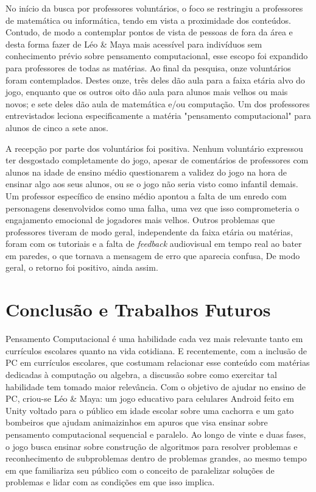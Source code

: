 \documentclass[conference]{IEEEtran}
\begin{document}
No início da busca por professores voluntários, o foco se restringiu a professores de matemática ou informática, tendo em vista a proximidade dos conteúdos. Contudo, de modo a contemplar pontos de vista de pessoas de fora da área e desta forma fazer de Léo \& Maya mais acessível para indivíduos sem conhecimento prévio sobre pensamento computacional, esse escopo foi expandido para professores de todas as matérias. Ao final da pesquisa, onze voluntários foram contemplados. Destes onze, três deles dão aula para a faixa etária alvo do jogo, enquanto que os outros oito dão aula para alunos mais velhos ou mais novos; e sete deles dão aula de matemática e/ou computação. Um dos professores entrevistados leciona especificamente a matéria "pensamento computacional" para alunos de cinco a sete anos.

A recepção por parte dos voluntários foi positiva. Nenhum voluntário expressou ter desgostado completamente do jogo, apesar de comentários de professores com alunos na idade de ensino médio questionarem a validez do jogo na hora de ensinar algo aos seus alunos, ou se o jogo não seria visto como infantil demais. Um professor específico de ensino médio apontou a falta de um enredo com personagens desenvolvidos como uma falha, uma vez que isso comprometeria o engajamento emocional de jogadores mais velhos. Outros problemas que professores tiveram de modo geral, independente da faixa etária ou matérias, foram com os tutoriais e a falta de \textit{feedback} audiovisual em tempo real ao bater em paredes, o que tornava a mensagem de erro que aparecia confusa, De modo geral, o retorno foi positivo, ainda assim.

\section{Conclusão e Trabalhos Futuros}

Pensamento Computacional é uma habilidade cada vez mais relevante tanto em currículos escolares quanto na vida cotidiana. E recentemente, com a inclusão de PC em currículos escolares, que costumam relacionar esse conteúdo com matérias dedicadas à computação ou algebra, a discussão sobre como exercitar tal habilidade tem tomado maior relevância. Com o objetivo de ajudar no ensino de PC, criou-se Léo \& Maya: um jogo educativo para celulares Android feito em Unity voltado para o público em idade escolar sobre uma cachorra e um gato bombeiros que ajudam animaizinhos em apuros que visa ensinar sobre pensamento computacional sequencial e paralelo. Ao longo de vinte e duas fases, o jogo busca ensinar sobre construção de algoritmos para resolver problemas e reconhecimento de subproblemas dentro de problemas grandes, ao mesmo tempo em que familiariza seu público com o conceito de paralelizar soluções de problemas e lidar com as condições em que isso implica. 
\end{document}
